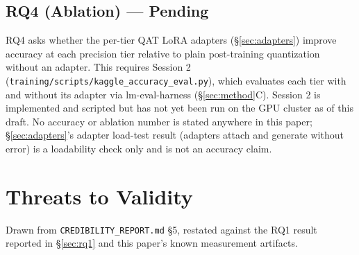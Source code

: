 \documentclass[conference]{IEEEtran}
\begin{document}
\subsection{RQ4 (Ablation) --- Pending}
\label{sec:rq4}

RQ4 asks whether the per-tier QAT LoRA adapters (\S\ref{sec:adapters})
improve accuracy at each precision tier relative to plain post-training
quantization without an adapter. This requires Session 2
(\texttt{training/scripts/kaggle\_accuracy\_eval.py}), which evaluates
each tier with and without its adapter via lm-eval-harness
(\S\ref{sec:method}C). Session 2 is implemented and scripted but has not
yet been run on the GPU cluster as of this draft. No accuracy or
ablation number is stated anywhere in this paper; \S\ref{sec:adapters}'s
adapter load-test result (adapters attach and generate without error) is
a loadability check only and is not an accuracy claim.

\section{Threats to Validity}
\label{sec:threats}

Drawn from \texttt{CREDIBILITY\_REPORT.md} \S 5, restated against the
RQ1 result reported in \S\ref{sec:rq1} and this paper's known
measurement artifacts.
\end{document}
